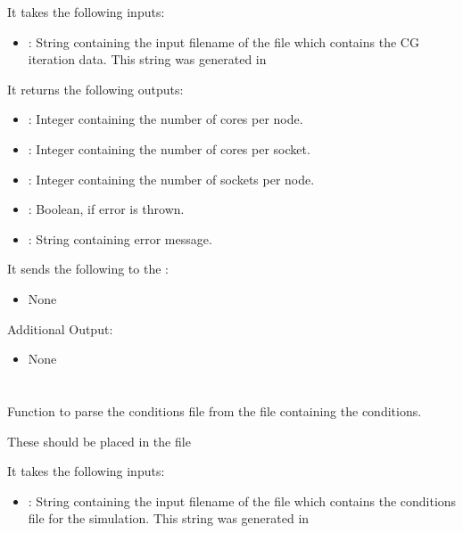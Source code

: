 It takes the following inputs:

\begin{itemize}
\item {}: String containing the input filename of the  file which contains the CG iteration data. This string was generated in 
\end{itemize}

It returns the following outputs:

\begin{itemize}
\item {}: Integer containing the number of cores per node.
\item {}: Integer containing the number of cores per socket.
\item {}: Integer containing the number of sockets per node.
\item {}: Boolean,  if error is thrown.
\item {}: String containing error message.
\end{itemize}

It sends the following to the :

\begin{itemize}
\item None
\end{itemize}

Additional Output:
\begin{itemize}
\item None
\end{itemize}

\section{}

Function to parse the conditions file from the  file containing the conditions.  

These should be placed in the file 

It takes the following inputs:

\begin{itemize}
\item {}: String containing the input filename of the  file which contains the conditions file for the simulation. This string was generated in 
\end{itemize}

